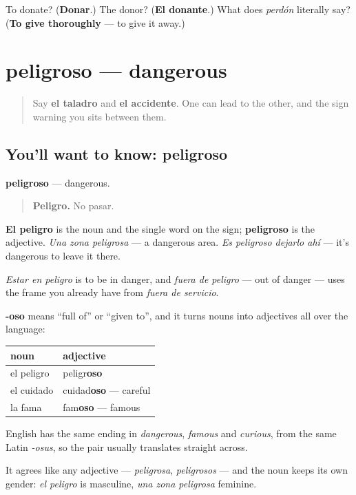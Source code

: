 \begin{tcolorbox}[breakable,colback=teal!4,colframe=teal!35!black,title={Before you move on}]
To donate? (\textbf{Donar}.) The donor? (\textbf{El donante}.) What does \emph{perdón} literally say? (\textbf{To give thoroughly} — to give it away.)
\end{tcolorbox}
\section[peligroso]{peligroso — dangerous}

\label{lesson:ES-C461-peligroso}



\begin{quote}
Say \textbf{el taladro} and \textbf{el accidente}. One can lead to the other, and the sign warning you sits between them.
\end{quote}

\subsection*{You'll want to know: peligroso}
\textbf{peligroso} — dangerous.

\begin{quote}
\textbf{Peligro.} No pasar.
\end{quote}

\textbf{El peligro} is the noun and the single word on the sign; \textbf{peligroso} is the adjective. \emph{Una zona peligrosa} — a dangerous area. \emph{Es peligroso dejarlo ahí} — it's dangerous to leave it there.

\emph{Estar en peligro} is to be in danger, and \emph{fuera de peligro} — out of danger — uses the frame you already have from \emph{fuera de servicio}.

\begin{grammarlens}[title={Grammar Lens: -oso makes an adjective of a noun}]
\textbf{-oso} means \textquotedblleft{}full of\textquotedblright{} or \textquotedblleft{}given to\textquotedblright{}, and it turns nouns into adjectives all over the language:

\noindent
\begin{tabularx}{\linewidth}{@{}>{\raggedright\arraybackslash}X>{\raggedright\arraybackslash}X@{}}
\toprule
\textbf{noun} & \textbf{adjective} \\
\midrule
el peligro & peligr\textbf{oso} \\
el cuidado & cuidad\textbf{oso} — careful \\
la fama & fam\textbf{oso} — famous \\
\bottomrule
\end{tabularx}

English has the same ending in \emph{dangerous}, \emph{famous} and \emph{curious}, from the same Latin \emph{-osus}, so the pair usually translates straight across.

It agrees like any adjective — \emph{peligrosa}, \emph{peligrosos} — and the noun keeps its own gender: \emph{el peligro} is masculine, \emph{una zona peligrosa} feminine.
\end{grammarlens}

